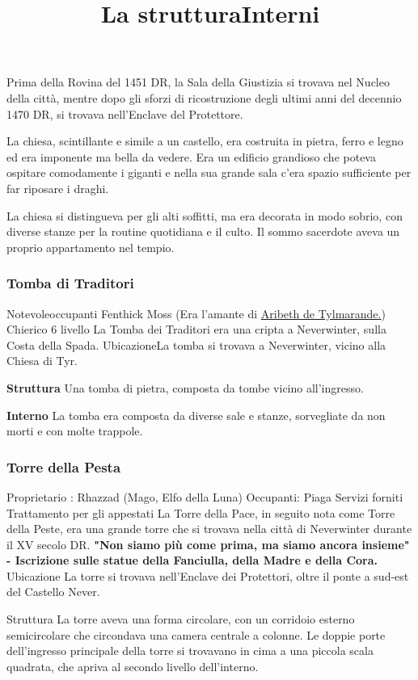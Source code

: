 \documentclass{article}
\begin{document}
Prima della Rovina del 1451 DR, la Sala della Giustizia si trovava nel Nucleo della città, mentre dopo gli sforzi di ricostruzione degli ultimi anni del decennio 1470 DR, si trovava nell'Enclave del Protettore.\newline

\title{La struttura}
La chiesa, scintillante e simile a un castello, era costruita in pietra, ferro e legno ed era imponente ma bella da vedere. Era un edificio grandioso che poteva ospitare comodamente i giganti e nella sua grande sala c'era spazio sufficiente per far riposare i draghi.\newline
\title{Interni}
La chiesa si distingueva per gli alti soffitti, ma era decorata in modo sobrio, con diverse stanze per la routine quotidiana e il culto. Il sommo sacerdote aveva un proprio appartamento nel tempio.
\subsubsection{Tomba di Traditori }
Notevoleoccupanti
Fenthick Moss (Era l'amante di \hyperlink{https://forgottenrealms.fandom.com/wiki/Aribeth_de_Tylmarande}{Aribeth de Tylmarande.}) Chierico 6 livello
La Tomba dei Traditori era una cripta a Neverwinter, sulla Costa della Spada.
UbicazioneLa tomba si trovava a Neverwinter, vicino alla Chiesa di Tyr.

\textbf{Struttura}
Una tomba di pietra, composta da tombe vicino all'ingresso.

\textbf{Interno}
La tomba era composta da diverse sale e stanze, sorvegliate da non morti e con molte trappole.
\subsubsection{Torre della Pesta}
Proprietario : Rhazzad (Mago, Elfo della Luna) \newline
Occupanti: Piaga \newline
Servizi forniti
Trattamento per gli appestati
La Torre della Pace, in seguito nota come Torre della Peste, era una grande torre che si trovava nella città di Neverwinter durante il XV secolo DR.
\textbf{"Non siamo più come prima, ma siamo ancora insieme"
- Iscrizione sulle statue della Fanciulla, della Madre e della Cora.}
Ubicazione\newline
La torre si trovava nell'Enclave dei Protettori, oltre il ponte a sud-est del Castello Never.

Struttura\newline
La torre aveva una forma circolare, con un corridoio esterno semicircolare che circondava una camera centrale a colonne. Le doppie porte dell'ingresso principale della torre si trovavano in cima a una piccola scala quadrata, che apriva al secondo livello dell'interno.
\end{document}
